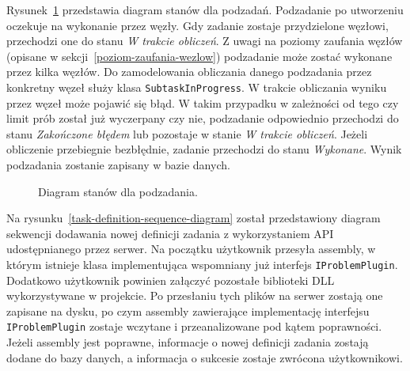 \documentclass[a4paper,11pt,twoside]{report}
\theoremstyle{definition}
\begin{document}
Rysunek~\ref{subtask-state-diagram} przedstawia diagram stanów dla podzadań. Podzadanie po utworzeniu oczekuje na wykonanie przez węzły. Gdy zadanie zostaje przydzielone węzłowi, przechodzi one do stanu \textit{W trakcie obliczeń}. Z uwagi na poziomy zaufania węzłów (opisane w sekcji~\ref{poziom-zaufania-wezlow}) podzadanie może zostać wykonane przez kilka węzłów. Do zamodelowania obliczania danego podzadania przez konkretny węzeł służy klasa \texttt{SubtaskInProgress}. W trakcie obliczania wyniku przez węzeł może pojawić się błąd. W takim przypadku w zależności od tego czy limit prób został już wyczerpany czy nie, podzadanie odpowiednio przechodzi do stanu \textit{Zakończone błędem} lub pozostaje w stanie \textit{W trakcie obliczeń}. Jeżeli obliczenie przebiegnie bezbłędnie, zadanie przechodzi do stanu \textit{Wykonane}. Wynik podzadania zostanie zapisany w bazie danych.

\begin{figure} 
    \caption{Diagram stanów dla podzadania.}
    \label{subtask-state-diagram}
\end{figure}


Na rysunku~\ref{task-definition-sequence-diagram} został przedstawiony diagram sekwencji dodawania nowej definicji zadania z wykorzystaniem API udostępnianego przez serwer. 
Na początku użytkownik przesyła assembly, w którym istnieje klasa implementująca wspomniany już interfejs \texttt{IProblemPlugin}.
Dodatkowo użytkownik powinien załączyć pozostałe biblioteki DLL wykorzystywane w projekcie.
Po przesłaniu tych plików na serwer zostają one zapisane na dysku, po czym assembly zawierające implementację interfejsu \texttt{IProblemPlugin} zostaje wczytane i przeanalizowane pod kątem poprawności.
Jeżeli assembly jest poprawne, informacje o nowej definicji zadania zostają dodane do bazy danych, a informacja o sukcesie zostaje zwrócona użytkownikowi.
\end{document}
